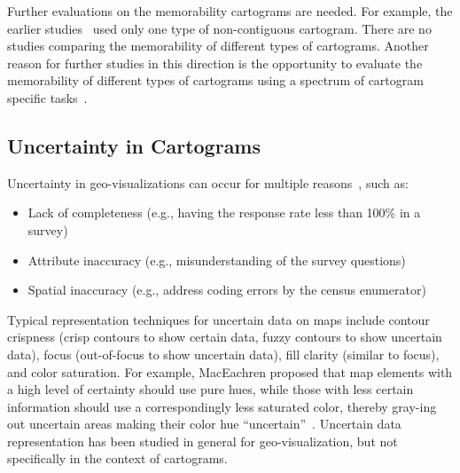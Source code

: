 \documentclass{egpubl}
\begin{document}
Further evaluations on the memorability cartograms are needed. For example, the earlier studies~\cite{rittschof1998learning,rittschof1994comparing} used only one type of non-contiguous cartogram. There are no studies comparing the memorability of different types of cartograms. Another reason for further studies in this direction is the opportunity to evaluate the memorability of different types of cartograms using a spectrum of cartogram specific tasks~\cite{Task_C}.



\subsection{Uncertainty in Cartograms}

Uncertainty in geo-visualizations can occur for multiple reasons~\cite{maceachren2005visualizing}, such as:

\begin{itemize}
\item Lack of completeness (e.g., having the response rate less than 100\% in a survey)

\item Attribute inaccuracy (e.g., misunderstanding of the survey questions)


\item Spatial inaccuracy (e.g., address coding errors by the census enumerator)

\end{itemize}

Typical representation techniques for uncertain data on maps include contour crispness (crisp contours to show certain data, fuzzy contours to show uncertain data), focus (out-of-focus to show uncertain data), fill clarity (similar to focus), and color saturation. For example, MacEachren proposed that map elements with a high level of certainty should use pure hues, while those with less certain information should use a correspondingly less saturated color, thereby gray-ing out uncertain areas making their color hue ``uncertain''~\cite{maceachren1992visualizing}. 
Uncertain data representation has been studied in general for geo-visualization, but not specifically in the context of cartograms. 
\end{document}
